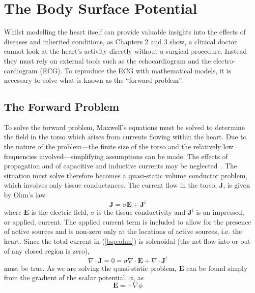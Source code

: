 \chapter{The Body Surface Potential}

Whilst modelling the heart itself can provide valuable insights into the effects
of diseases and inherited conditions, as Chapters 2 and 3 show, a clinical
doctor cannot look at the heart's activity directly without a surgical
procedure.
Instead they must rely on external tools such as the echocardiogram and the
electro-cardiogram (ECG).
To reproduce the ECG with mathematical models, it is necessary to solve what is known as
the ``forward problem''.


\section{The Forward Problem}

To solve the forward problem, Maxwell's equations must be solved to determine the
field in the torso which arises from currents flowing within the heart.
Due to the nature of the problem---the finite size of the torso and the
relatively low frequencies involved---simplifying assumptions can be made.
The effects of propagation and of capacitive and inductive currents may be
neglected~\cite{Barnard1966}.
The situation must solve therefore becomes a quasi-static volume conductor
problem, which involves only tissue conductances.
The current flow in the torso, $\mathbf{J}$, is given by Ohm's law
\begin{equation}
\label{bsp:ohm}
\mathbf{J} = \sigma\mathbf{E} + \mathbf{J}^{i}
\end{equation}
where $\mathbf{E}$ is the electric field, $\sigma$ is the tissue conductivity
and $\mathbf{J}^{i}$ is an impressed, or applied, current.
The applied current term is included to allow for the presence of active sources and
is non-zero only at the locations of active sources, i.e. the heart.
Since the total current in (\ref{bsp:ohm}) is solenoidal (the net flow into or
out of any closed region is zero),
\begin{equation}
\label{bsp:ohm2}
\nabla \cdot \mathbf{J} = 0 = \sigma \nabla \cdot \mathbf{E} + \nabla \cdot \mathbf{J}^{i}
\end{equation}
must be true.
As we are solving the quasi-static problem, $\mathbf{E}$ can be
found simply from the gradient of the scalar potential, $\phi$, as
\begin{equation}
\label{bsp:maxwell}
\mathbf{E} = - \nabla\phi
\end{equation}

